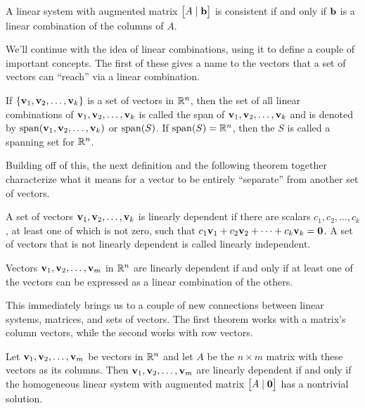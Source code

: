 \documentclass[../m073main.tex]{subfiles}
\begin{document}
\begin{theorem}
	A linear system with augmented matrix $\begin{bmatrix} A \;|\; \mathbf{b} \end{bmatrix}$ is consistent if and only if $\mathbf{b}$ is a linear combination of the columns of $A$.
\end{theorem}

We'll continue with the idea of linear combinations, using it to define a couple of important concepts.
The first of these gives a name to the vectors that a set of vectors can ``reach'' via a linear combination.

\begin{definition}[Span]
	If $\{\mathbf{v}_1, \mathbf{v}_2, \ldots, \mathbf{v}_k\}$ is a set of vectors in $\mathbb{R}^n$, then the set of all linear combinations of $\mathbf{v}_1, \mathbf{v}_2, \ldots, \mathbf{v}_k$ is called the span of $\mathbf{v}_1, \mathbf{v}_2, \ldots, \mathbf{v}_k$ and is denoted by $\operatorname{span}(\mathbf{v}_1, \mathbf{v}_2, \ldots, \mathbf{v}_k)$ or $\operatorname{span}(S)$.
	If $\operatorname{span}(S) = \mathbb{R}^n$, then the $S$ is called a spanning set for $\mathbb{R}^n$.
\end{definition}

Building off of this, the next definition and the following theorem together characterize what it means for a vector to be entirely ``separate'' from another set of vectors.

\begin{definition}
	A set of vectors $\mathbf{v}_1, \mathbf{v}_2, \ldots, \mathbf{v}_k$ is linearly dependent if there are scalars $c_1, c_2, \ldots, c_k$, at least one of which is not zero, such that $c_1 \mathbf{v}_1 + c_2 \mathbf{v}_2 + \cdots + c_k \mathbf{v}_k = \mathbf{0}$.
	A set of vectors that is not linearly dependent is called linearly independent.
\end{definition}

\begin{theorem}
	Vectors $\mathbf{v}_1, \mathbf{v}_2, \ldots, \mathbf{v}_m$ in $\mathbb{R}^n$ are linearly dependent if and only if at least one of the vectors can be expressed as a linear combination of the others.
\end{theorem}

This immediately brings us to a couple of new connections between linear systems, matrices, and sets of vectors.
The first theorem works with a matrix's column vectors, while the second works with row vectors.

\begin{theorem}
	Let $\mathbf{v}_1, \mathbf{v}_2, \ldots, \mathbf{v}_m$ be vectors in $\mathbb{R}^n$ and let $A$ be the $n \times m$ matrix with these vectors as its columns.
	Then $\mathbf{v}_1, \mathbf{v}_2, \ldots, \mathbf{v}_m$ are linearly dependent if and only if the homogeneous linear system with augmented matrix $\begin{bmatrix} A \;|\; \mathbf{0} \end{bmatrix}$ has a nontrivial solution.
\end{theorem}
\end{document}
